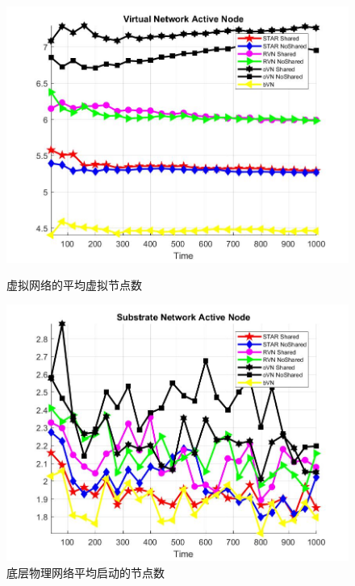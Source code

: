 \begin{figure}[htbp]
\centering
\begin{minipage}{0.4\textwidth}
\centering
\includegraphics[width=\textwidth]{figures/ActiveNodeAverageVirtualNetwork}
\caption{虚拟网络的平均虚拟节点数}\label{fig:ActiveNodeAverageVirtualNetwork}
\end{minipage}
\begin{minipage}{0.4\textwidth}
\centering
\includegraphics[width=\textwidth]{figures/ActiveNodeAverageSubstrateNetwork}
\caption{底层物理网络平均启动的节点数}\label{fig:ActiveNodeAverageSubstrateNetwork}
\end{minipage}
\begin{minipage}{0.4\textwidth}
\centering

\end{minipage}
\end{figure}
